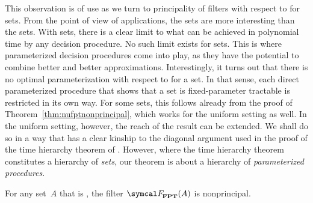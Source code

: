 %
This observation is of use as we turn to principality of filters with respect to  for  sets.
From the point of view of applications, the  sets are more interesting than the  sets.
With  sets, there is a clear limit to what can be achieved in polynomial time by any decision procedure.
No such limit exists for  sets.
This is where parameterized decision procedures come into play, as they have the potential to combine better and better approximations.
Interestingly, it turns out that there is no optimal parameterization with respect to  for a  set.
In that sense, each direct parameterized procedure that shows that a  set is fixed-parameter tractable is restricted in its own way.
For some  sets, this follows already from the proof of Theorem~\ref{thm:nufptnonprincipal}, which works for the uniform setting as well.
In the uniform setting, however, the reach of the result can be extended.
We shall do so in a way that has a clear kinship to the diagonal argument used in the proof of the time hierarchy theorem of \textcite{hartmanis1965computational}.
However, where the time hierarchy theorem constitutes a hierarchy of \emph{sets}, our theorem is about a hierarchy of \emph{parameterized procedures}.
\begin{theorem}
\label{thm:fptnonprincipal}%
  For any set~$A$ that is , the filter $\calF_\cl{FPT}(A)$ is nonprincipal.
\end{theorem}

